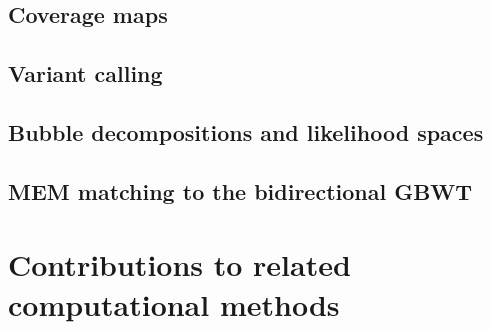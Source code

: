 \subsection{Coverage maps}

\subsection{Variant calling}

\subsection{Bubble decompositions and likelihood spaces}

\subsection{MEM matching to the bidirectional GBWT}


\section{Contributions to related computational methods}


